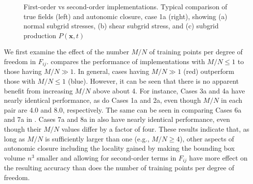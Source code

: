 %
\begin{figure}
	\centering %
	\label{F:CL18a}
\end{figure}
%
\begin{figure}
	\ContinuedFloat
	\centering %
	\label{F:CL18b}
\end{figure}
%
\begin{figure}
	\ContinuedFloat
	\centering %
	\label{F:CL18c}
\end{figure}
%
\begin{figure}
	\ContinuedFloat
	\caption{First-order vs second-order implementations. Typical comparison of  true fields (left) and autonomic closure, case 1a (right), showing (a) normal subgrid stresses, (b) shear subgrid stress, and (c) subgrid production $P(\mathbf{x},t)$}
	\label{F:CL18}
\end{figure}
%
%
We first examine the effect of the number  $M/N$ of training points per degree of freedom 
in $F_{ij}$.   compares the performance of implementations with $M/N \leq 1$  to those having $M/N \gg 1$. In general, cases having  $M/N \gg 1$ (red) outperform those with  $M/N \leq 1$ (blue). However, it can be seen that there is no apparent benefit from increasing $M/N$ above about 4. For instance, Cases 3a and 4a have nearly identical performance, as do Cases 1a and 2a, even though  $M/N$ in each pair are 4.0 and 8.0, respectively. The same can be seen in comparing Cases 6a and 7a in . Cases 7a and 8a in  also have nearly identical performance, even though their $M/N$ values differ by a factor of four. These results indicate that, as long as $M/N$  is sufficiently larger than one (e.g., $M/N \geq 4$), other aspects of autonomic closure including the locality gained by making the bounding box volume  $n^3$ smaller and allowing for second-order terms in $F_{ij}$  have more effect on the resulting accuracy than does the number of training points per degree of freedom.

